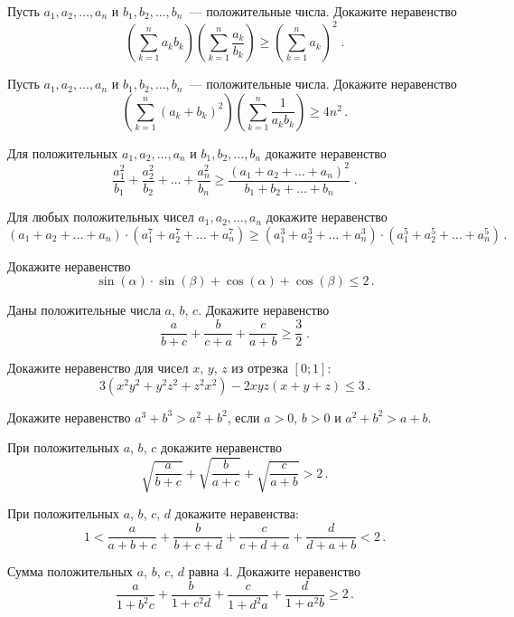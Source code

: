 \begin{problems}

\item
Пусть $a_1, a_2, \ldots, a_n$ и $b_1, b_2, \ldots, b_n$~--- положительные
числа.
Докажите неравенство
\[
    \left(
        \sum_{k=1}^n
            a_k b_k
    \right)
    \left(
        \sum_{k=1}^n
            \frac{a_k}{b_k}
    \right)
\geq
    \left(
        \sum_{k=1}^n
            a_k
    \right)^2
\;.\]

\item
Пусть $a_1, a_2, \ldots, a_n$ и $b_1, b_2, \ldots, b_n$~--- положительные
числа.
Докажите неравенство
\[
    \left(
        \sum_{k=1}^n
            (a_k + b_k)^2
    \right)
    \left(
        \sum_{k=1}^n
            \frac{1}{a_k b_k}
    \right)
\geq
    4 n^2
\,.\]

\item
Для положительных $a_1, a_2, \ldots, a_n$ и $b_1, b_2, \ldots, b_n$ докажите
неравенство
\[
    \frac{a_1^2}{b_1} + \frac{a_2^2}{b_2} + \ldots + \frac{a_n^2}{b_n}
\geq
    \frac{
        (a_1 + a_2 + \ldots + a_n)^2
    }{
        b_1 + b_2 + \ldots + b_n
    }
\;.\]

\item
Для любых положительных чисел $a_1, a_2, \ldots, a_n$ докажите неравенство
\[
    (a_1 + a_2 + \ldots + a_n)
    \cdot
    (a_1^7 + a_2^7 + \ldots + a_n^7)
\geq
    (a_1^3 + a_2^3 + \ldots + a_n^3)
    \cdot
    (a_1^5 + a_2^5 + \ldots + a_n^5)
\,.\]

\item
Докажите неравенство
\[
    \sin (\alpha) \cdot \sin (\beta) + \cos (\alpha) + \cos (\beta)
\leq
    2
\,.\]

\item
Даны положительные числа $a$, $b$, $c$.
Докажите неравенство
\[
    \frac{a}{b + c} + \frac{b}{c + a} + \frac{c}{a + b}
\geq
    \frac{3}{2}
\;.\]

\item
Докажите неравенство для чисел $x$, $y$, $z$ из отрезка $[0; 1]$:
\[
    3 (x^2 y^2 + y^2 z^2 + z^2 x^2) - 2 x y z (x + y + z)
\leq
    3
\,.\]

\item
Докажите неравенство $a^3 + b^3 > a^2 + b^2$, если $a > 0$, $b > 0$ и
$a^2 + b^2 > a + b$.

\item
При положительных $a$, $b$, $c$ докажите неравенство
\[
    \sqrt{\frac{a}{b + c}} +
    \sqrt{\frac{b}{a + c}} +
    \sqrt{\frac{c}{a + b}}
>
    2
\,.\]

\item
При положительных $a$, $b$, $c$, $d$ докажите неравенства:
\[
    1
<
    \frac{a}{a + b + c} + \frac{b}{b + c + d} +
    \frac{c}{c + d + a} + \frac{d}{d + a + b}
<
    2
\,.\]

\item
Сумма положительных $a$, $b$, $c$, $d$ равна $4$.
Докажите неравенство
\[
    \frac{a}{1 + b^2c} + \frac{b}{1 + c^2d} +
    \frac{c}{1 + d^2a} + \frac{d}{1 + a^2b}
\geq
    2
\,.\]

\end{problems}

